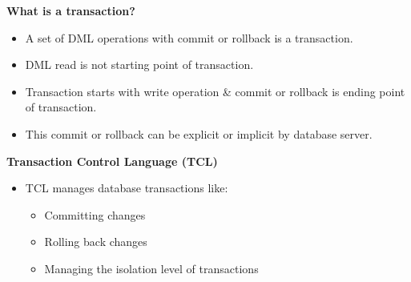 
\begin{flushleft}

	\textbf{What is a transaction?}
	\begin{itemize}
		\item A set of DML operations with commit or rollback is a transaction.
		\item DML read is not starting point of transaction.
		\item Transaction starts with write operation \& commit or rollback is ending point of transaction.
		\item This commit or rollback can be explicit or implicit by database server.
	\end{itemize}
	
	
	\textbf{Transaction Control Language (TCL)}
	\begin{itemize}
		\item TCL manages database transactions like:
		\begin{itemize}
			\item Committing changes
			\item Rolling back changes
			\item Managing the isolation level of transactions 
		\end{itemize}
		
	\end{itemize}
	
\end{flushleft}
\newpage